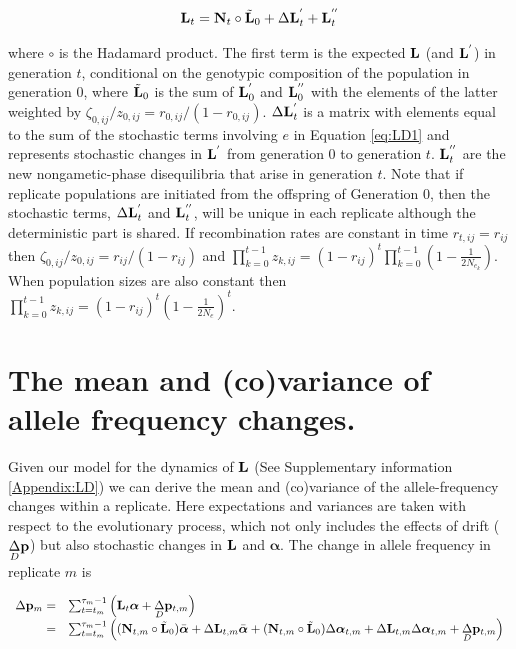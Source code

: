 \documentclass[12pt]{article}
\begin{document}
\begin{bibunit}
\begin{equation}
{\bf L}_{t}= {\bf N}_t\circ\tilde{\bf L}_{0}+\Delta {\bf L}^{'}_t+{\bf L}^{''}_t
\label{eq:LD3}
\end{equation}
 
where $\circ$ is the Hadamard product. The first term is the expected ${\bf L}$ (and ${\bf L}^{'}$) in generation $t$, conditional on the genotypic composition of the population in generation 0, where $\tilde{\bf L}_{0}$ is the sum of ${\bf L}^{'}_{0}$ and ${\bf L}^{''}_{0}$ with the elements of the latter weighted by $\zeta_{{0},ij}/z_{{0},ij}=r_{0,ij}/(1-r_{0,ij})$. $\Delta {\bf L}^{'}_t$ is a matrix with elements equal to the sum of the stochastic terms involving $e$ in Equation \ref{eq:LD1} and represents stochastic changes in ${\bf L}^{'}$ from generation 0 to generation $t$. ${\bf L}^{''}_t$ are the new nongametic-phase disequilibria that arise in generation $t$. Note that if replicate populations are initiated from the offspring of Generation $0$, then the stochastic terms, $\Delta {\bf L}^{'}_t$ and ${\bf L}^{''}_t$, will be unique in each replicate although the deterministic part is shared. If recombination rates are constant in time $r_{t, ij}=r_{i j}$ then $\zeta_{{0},ij}/z_{{0},ij} = r_{ij}/(1-r_{ij})$ and $\prod_{k=0}^{t-1}z_{{k},ij} =(1-r_{ij})^{t}\prod_{k=0}^{t-1}(1-\frac{1}{2N_{e_k}})$. When population sizes are also constant then $\prod_{k=0}^{t-1}z_{{k},ij} =(1-r_{ij})^{t}(1-\frac{1}{2N_e})^t$. 


\section{The mean and (co)variance of allele frequency changes.}
\label{App:dist}

Given our model for the dynamics of ${\bf L}$ (See Supplementary information \ref{Appendix:LD}) we can derive the mean and (co)variance of the allele-frequency changes within a replicate. Here expectations and variances are taken with respect to the evolutionary process, which not only includes the effects of drift ($\underset{D}\Delta {\bf p}$) but also stochastic changes in  ${\bf L}$ and $\boldsymbol{\alpha}$. The change in allele frequency in replicate $m$ is

\begin{equation}
\begin{array}{rl}
\Delta {\bf p}_m
=&\sum_{t=t_m}^{\tau_m-1} \left({\bf L}_t{\boldsymbol{\alpha}}+\underset{D}\Delta {\bf p}_{t, m}\right)\\
=& \sum_{t=t_m}^{\tau_m-1} \left(({\bf N}_{t,m}\circ\tilde{\bf L}_0)\bar{\boldsymbol{\alpha}}+\Delta{\bf L}_{t,m}\bar{\boldsymbol{\alpha}}+({\bf N}_{t,m}\circ\tilde{\bf L}_0)\Delta\boldsymbol{\alpha}_{t,m}+\Delta{\bf L}_{t,m}\Delta\boldsymbol{\alpha}_{t,m}+\underset{D}\Delta {\bf p}_{t, m}\right)\\
\end{array}
\end{equation}


\end{bibunit}
\end{document}
